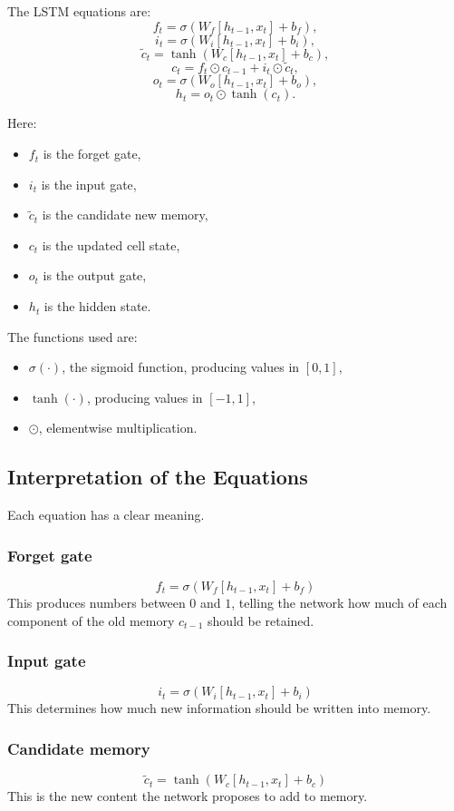 The LSTM equations are:
\[
f_t = \sigma(W_f [h_{t-1},x_t] + b_f),
\]
\[
i_t = \sigma(W_i [h_{t-1},x_t] + b_i),
\]
\[
\tilde{c}_t = \tanh(W_c [h_{t-1},x_t] + b_c),
\]
\[
c_t = f_t \odot c_{t-1} + i_t \odot \tilde{c}_t,
\]
\[
o_t = \sigma(W_o [h_{t-1},x_t] + b_o),
\]
\[
h_t = o_t \odot \tanh(c_t).
\]

Here:
\begin{itemize}
    \item \(f_t\) is the forget gate,
    \item \(i_t\) is the input gate,
    \item \(\tilde{c}_t\) is the candidate new memory,
    \item \(c_t\) is the updated cell state,
    \item \(o_t\) is the output gate,
    \item \(h_t\) is the hidden state.
\end{itemize}

The functions used are:
\begin{itemize}
    \item \(\sigma(\cdot)\), the sigmoid function, producing values in \([0,1]\),
    \item \(\tanh(\cdot)\), producing values in \([-1,1]\),
    \item \(\odot\), elementwise multiplication.
\end{itemize}

\subsection{Interpretation of the Equations}

Each equation has a clear meaning.

\subsubsection*{Forget gate}
\[
f_t = \sigma(W_f [h_{t-1},x_t] + b_f)
\]
This produces numbers between \(0\) and \(1\), telling the network how much of each component of the old memory \(c_{t-1}\) should be retained.

\subsubsection*{Input gate}
\[
i_t = \sigma(W_i [h_{t-1},x_t] + b_i)
\]
This determines how much new information should be written into memory.

\subsubsection*{Candidate memory}
\[
\tilde{c}_t = \tanh(W_c [h_{t-1},x_t] + b_c)
\]
This is the new content the network proposes to add to memory.

